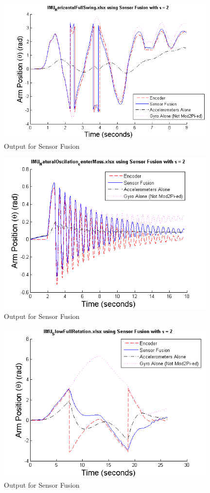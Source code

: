 \documentclass{article}
\theoremstyle{plain}
\theoremstyle{definition}
\theoremstyle{remark}
\begin{document}
\begin{figure}[hbt]
\begin{center}
\includegraphics[width = 11cm]{SF_out_7.png}
\caption{Output for Sensor Fusion}
\label{SF_out_7}
\end{center}
\end{figure}



\begin{figure}[hbt]
\begin{center}
\includegraphics[width = 11cm]{SF_out_8.png}
\caption{Output for Sensor Fusion}
\label{SF_out_8}
\end{center}
\end{figure}


\begin{figure}[hbt]
\begin{center}
\includegraphics[width = 11cm]{SF_out_1.png}
\caption{Output for Sensor Fusion}
\label{SF_out_1}
\end{center}
\end{figure}
\end{document}

